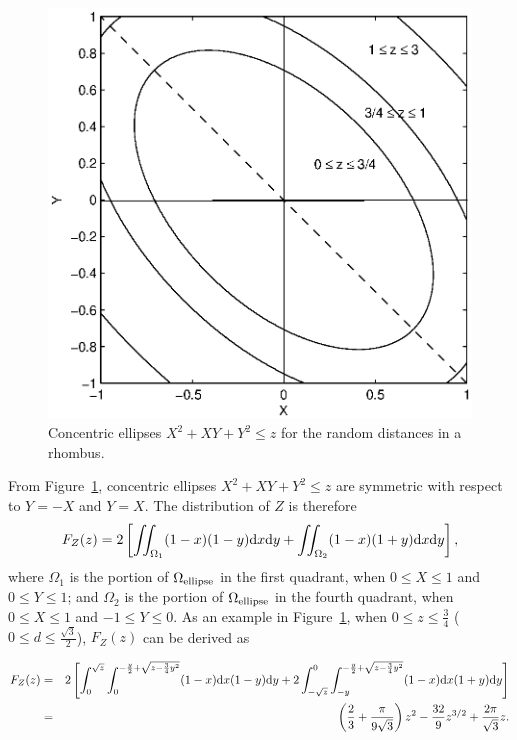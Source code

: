 \documentclass[12pt,draftclsnofoot,onecolumn]{IEEEtran}
\begin{document}
\begin{figure}
  \centering
  \includegraphics[width=0.5\columnwidth]{fig/rhombus_within}
  \caption{Concentric ellipses $X^2+XY+Y^2 \leq z$ for the random distances in a rhombus.}
  \label{fig:z1}
\end{figure}

From Figure~\ref{fig:z1}, concentric ellipses $X^2+XY+Y^2 \leq z$ are symmetric with respect
to $Y=-X$ and $Y=X$. The distribution of $Z$ is therefore
\begin{equation}\label{eq:within}
F_Z(z)=2\left[\iint_{\Omega_1}(1-x)(1-y){\rm d}x{\rm
d}y+\iint_{\Omega_2}(1-x)(1+y){\rm d}x{\rm d}y\right],
\end{equation}
where $\Omega_1$ is the portion of $\Omega_{\rm ellipse}$ in the first quadrant, 
when 
$0 \leq X\leq 1$ and $0 \leq Y \leq 1$; and $\Omega_2$ is the portion of 
$\Omega_{\rm ellipse}$ in the fourth quadrant, when
$0 \leq X \leq 1$ and $-1 \leq Y \leq 0$. As an example in Figure~\ref{fig:z1},
when $0\leq z \leq \frac{3}{4}$ ($0\leq d\leq\frac{\sqrt{3}}{2}$), $F_Z(z)$ can be derived as
\begin{small}
\begin{eqnarray}\label{eq:Z1_r_within}
F_Z(z)&=&2\left[\int_{0}^{\sqrt{z}}\int_{0}^{-\frac{y}{2}+\sqrt{z-\frac{3}{4}y^2
}}(1-x){\rm d}x(1-y){\rm
d}y+2\int_{-\sqrt{z}}^0\int_{-y}^{-\frac{y}{2}+\sqrt{z-\frac{3}{4}
y^2}}(1-x){\rm d}x(1+y){\rm d}y\right] \nonumber\\
&=&\left(\frac{2}{3}+\frac{\pi}{9\sqrt{3}}\right)z^2-\frac{32}{9}z^{3/2}+\frac{
2\pi}{\sqrt{3}}z.
\end{eqnarray}
\end{small}%
\end{document}
